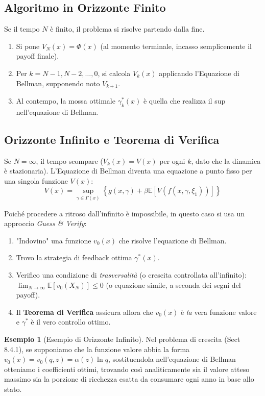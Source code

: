 \documentclass[11pt, a4paper]{report}
\theoremstyle{plain}
\theoremstyle{definition}
\newtheorem{esempio}[theorem]{Esempio}
\theoremstyle{remark}
\newcommand{\E}{\mathbb{E}}
\newcommand{\1}{\mathbf{1}}
\begin{document}
\subsection{Algoritmo in Orizzonte Finito}
Se il tempo $N$ è finito, il problema si risolve partendo dalla fine.
\begin{enumerate}
    \item Si pone $V_N(x) = \Phi(x)$ (al momento terminale, incasso semplicemente il payoff finale).
    \item Per $k = N-1, N-2, \dots, 0$, si calcola $V_k(x)$ applicando l'Equazione di Bellman, supponendo noto $V_{k+1}$.
    \item Al contempo, la mossa ottimale $\gamma^*_k(x)$ è quella che realizza il sup nell'equazione di Bellman.
\end{enumerate}

\subsection{Orizzonte Infinito e Teorema di Verifica}
Se $N = \infty$, il tempo scompare ($V_k(x) = V(x)$ per ogni $k$, dato che la dinamica è stazionaria). L'Equazione di Bellman diventa una equazione a punto fisso per una singola funzione $V(x)$:
\[ V(x) = \sup_{\gamma \in \Gamma(x)} \left\{ g(x, \gamma) + \beta \E \left[ V(f(x, \gamma, \xi_1)) \right] \right\} \]

Poiché procedere a ritroso dall'infinito è impossibile, in questo caso si usa un approccio \emph{Guess \& Verify}:
\begin{enumerate}
    \item "Indovino" una funzione $v_0(x)$ che risolve l'equazione di Bellman.
    \item Trovo la strategia di feedback ottima $\gamma^*(x)$.
    \item Verifico una condizione di \emph{trasversalità} (o crescita controllata all'infinito): $\lim_{N \to \infty} \E[v_0(X_N)] \le 0$ (o equazione simile, a seconda dei segni del payoff).
    \item Il \textbf{Teorema di Verifica} assicura allora che $v_0(x)$ è \emph{la} vera funzione valore e $\gamma^*$ è il vero controllo ottimo.
\end{enumerate}

\begin{esempio}[Esempio di Orizzonte Infinito]
Nel problema di crescita (Sect 8.4.1), se supponiamo che la funzione valore abbia la forma $v_0(x) = v_0(q, z) = \alpha(z) \ln q$, sostituendola nell'equazione di Bellman otteniamo i coefficienti ottimi, trovando così analiticamente sia il valore atteso massimo sia la porzione di ricchezza esatta da consumare ogni anno in base allo stato.
\end{esempio}
\end{document}
